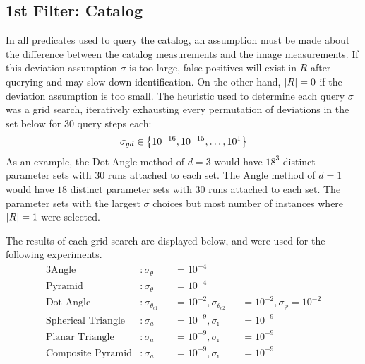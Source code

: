\subsection{1st Filter: Catalog}\label{subsec:1stFilter:Catalog}
In all predicates used to query the catalog, an assumption must be made about the difference between the catalog
measurements and the image measurements.
If this deviation assumption $\sigma$ is too large, false positives will exist in $R$ after querying and may slow
down identification.
On the other hand, $\left| R \right| = 0$ if the deviation assumption is too small.
The heuristic used to determine each query $\sigma$ was a grid search, iteratively exhausting every permutation of
deviations in the set below for 30 query steps each:
\begin{equation}
    \sigma_{gd} \in \left\{  10^{-16}, 10^{-15}, \ldots, 10^1  \right\}
\end{equation}
As an example, the Dot Angle method of $d = 3$ would have $18^3$ distinct parameter sets with 30 runs attached
to each set.
The Angle method of $d = 1$ would have $18$ distinct parameter sets with 30 runs attached to each set.
The parameter sets with the largest $\sigma$ choices but most number of instances where $\left| R \right| = 1$ were selected.

The results of each grid search are displayed below, and were used for the following experiments.
\begin{alignat*}{3}
    \text{Angle}&: \sigma_\theta &&= 10^{-4} &&{}\\
    \text{Pyramid}&: \sigma_\theta &&= 10^{-4} &&{} \\
    \text{Dot Angle}&: \sigma_{\theta_{c1}} &&= 10^{-2}, \sigma_{\theta_{c2}} &&= 10^{-2}, \sigma_\phi = 10^{-2} \\
    \text{Spherical Triangle}&: \sigma_a &&= 10^{-9}, \sigma_\imath &&= 10^{-9} \\
    \text{Planar Triangle}&: \sigma_a &&= 10^{-9}, \sigma_\imath &&= 10^{-9} \\
    \text{Composite Pyramid}&: \sigma_a &&= 10^{-9}, \sigma_\imath &&= 10^{-9}
\end{alignat*}

\begin{table}
\end{table}

